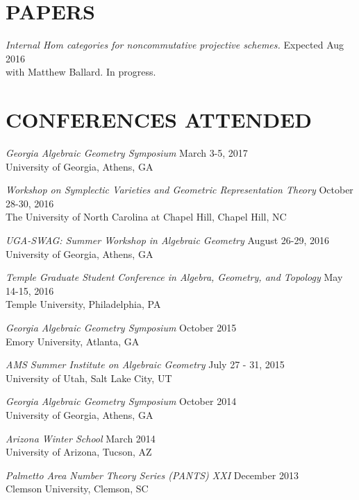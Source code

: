 \documentclass[line,overlapped]{res}
\begin{document}
\begin{resume}
 \section{PAPERS}
         {\sl  Internal Hom categories for noncommutative projective schemes.} \hfill Expected Aug 2016\\
	 with Matthew Ballard.  In progress.

 \newpage

 \section{CONFERENCES ATTENDED}
 {\sl Georgia Algebraic Geometry Symposium} \hfill March 3-5, 2017\\
 University of Georgia, Athens, GA

 {\sl Workshop on Symplectic Varieties and Geometric Representation Theory} \hfill October 28-30, 2016\\
 The University of North Carolina at Chapel Hill, Chapel Hill, NC
 
 {\sl UGA-SWAG: Summer Workshop in Algebraic Geometry} \hfill August 26-29, 2016\\
 University of Georgia, Athens, GA

         {\sl Temple Graduate Student Conference in Algebra, Geometry, and Topology} \hfill May 14-15, 2016\\
         Temple University, Philadelphia, PA
         
         {\sl Georgia Algebraic Geometry Symposium} \hfill October 2015\\
         Emory University, Atlanta, GA

         {\sl AMS Summer Institute on Algebraic Geometry} \hfill July 27 - 31, 2015\\
         University of Utah, Salt Lake City, UT

         {\sl Georgia Algebraic Geometry Symposium} \hfill October 2014\\
         University of Georgia, Athens, GA

         {\sl Arizona Winter School} \hfill March 2014\\
         University of Arizona, Tucson, AZ

         {\sl Palmetto Area Number Theory Series (PANTS) XXI} \hfill December 2013\\
         Clemson University, Clemson, SC


\end{resume}
\end{document}
